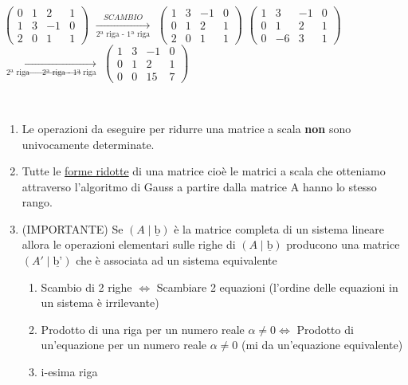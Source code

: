 \(
\begin{pmatrix}
	0 & 1 & 2 & 1\\
	1 & 3 & -1 & 0\\
	2 & 0 & 1 & 1
\end{pmatrix}
\)
$\underset{\text{2ª riga - 1ª riga}}{\overset{SCAMBIO}{\longrightarrow}}$
\( 
\begin{pmatrix}
	1 & 3 & -1 & 0 \\
	0 & 1 & 2 & 1 \\
	2 & 0 & 1 & 1
\end{pmatrix}
\)
\(
\begin{pmatrix}
	1 & 3 & -1 & 0 \\
	0 & 1 & 2 & 1 \\
	0 & -6 & 3 & 1
\end{pmatrix}
\)
$\underset{\text{2ª riga $\rightarrow$ 2ª riga - 1ª riga}}{\longrightarrow}$
\( 
\begin{pmatrix}
	1 & 3 & -1 & 0 \\
	0 & 1 & 2 & 1 \\
	0 & 0 & 15 & 7
\end{pmatrix}
\)


 \\

\begin{enumerate}
	\item \textsf{\small Le operazioni da eseguire per ridurre una matrice a scala \textbf{non} sono univocamente determinate.}
	\item \textsf{\small Tutte le \underline{forme ridotte} di una matrice cioè le matrici a scala che otteniamo attraverso l'algoritmo di Gauss a partire dalla matrice A hanno lo stesso rango.}
	\item \textsf{\small (IMPORTANTE) Se $(A\mid\underline{\text{b}})$ è la matrice completa di un sistema lineare allora le operazioni elementari sulle righe di $(A\mid\underline{\text{b}})$ producono una matrice $(A'\mid\underline{\text{b'}})$ che è associata ad un sistema equivalente}
	\begin{enumerate}
		\item \textsf{\small Scambio di 2 righe $\Leftrightarrow$ Scambiare 2 equazioni (l'ordine delle equazioni in un sistema è irrilevante)}
		\item \textsf{\small Prodotto di una riga per un numero reale $\alpha \neq 0 \Leftrightarrow$ Prodotto di un'equazione per un numero reale $\alpha \neq 0$ (mi da un'equazione equivalente)}
		\item \textsf{i-esima riga}
	\end{enumerate}
\end{enumerate}

